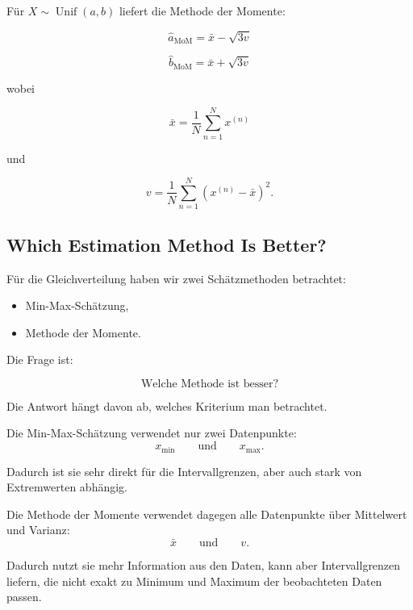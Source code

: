 \documentclass[11pt,a4paper]{scrartcl}
\begin{document}
\begin{answerbox}
    Für \(X \sim \operatorname{Unif}(a,b)\) liefert die Methode der Momente:

    \[
        \boxed{
            \hat a_{\mathrm{MoM}}
            =
            \bar x - \sqrt{3v}
        }
    \]

    \[
        \boxed{
            \hat b_{\mathrm{MoM}}
            =
            \bar x + \sqrt{3v}
        }
    \]

    wobei

    \[
        \boxed{
            \bar x
            =
            \frac{1}{N}
            \sum_{n=1}^{N} x^{(n)}
        }
    \]

    und

    \[
        \boxed{
            v
            =
            \frac{1}{N}
            \sum_{n=1}^{N}
            \left(x^{(n)}-\bar x\right)^2
        }.
    \]
\end{answerbox}

\subsection{Which Estimation Method Is Better?}

\begin{notebox}
    Für die Gleichverteilung haben wir zwei Schätzmethoden betrachtet:

    \begin{itemize}
        \item Min-Max-Schätzung,
        \item Methode der Momente.
    \end{itemize}

    Die Frage ist:

    \[
        \text{Welche Methode ist besser?}
    \]
\end{notebox}

\begin{solutionbox}
    Die Antwort hängt davon ab, welches Kriterium man betrachtet.

    Die Min-Max-Schätzung verwendet nur zwei Datenpunkte:
    \[
        x_{\min}
        \qquad \text{und} \qquad
        x_{\max}.
    \]

    Dadurch ist sie sehr direkt für die Intervallgrenzen, aber auch stark von
    Extremwerten abhängig.

    Die Methode der Momente verwendet dagegen alle Datenpunkte über Mittelwert
    und Varianz:
    \[
        \bar x
        \qquad \text{und} \qquad
        v.
    \]

    Dadurch nutzt sie mehr Information aus den Daten, kann aber Intervallgrenzen
    liefern, die nicht exakt zu Minimum und Maximum der beobachteten Daten
    passen.
\end{solutionbox}
\end{document}
